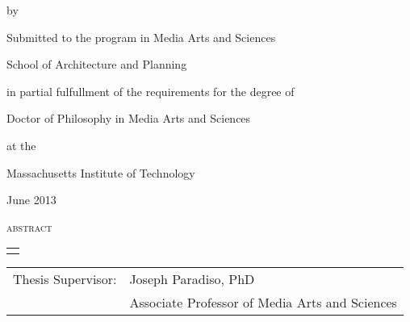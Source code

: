 \thispagestyle{empty}

\begingroup
\let\clearpage\relax
\let\cleardoublepage\relax
\let\cleardoublepage\relax

\begin{addmargin}[1cm]{-3cm}
\begin{samepage}
{\centering

    \begingroup
        \color{Maroon}
        {\Large\textsc{\myTitle}}
    \endgroup

    by

    \myName

    \vspace{4mm}

Submitted to the program in Media Arts and Sciences

School of Architecture and Planning

    \vspace{2mm}

in partial fulfullment of the requirements for the degree of

    \vspace{2mm}

Doctor of Philosophy in Media Arts and Sciences

at the

Massachusetts Institute of Technology

    \vspace{2mm}

June 2013



}

{\Large{\textsc{abstract}}}

\begin{tabular}{p{12cm}}
\hline\\
\end{tabular}


{\small

}

\vspace{4mm}
\noindent
\begin{tabular}{rl}
Thesis Supervisor:&Joseph Paradiso, PhD\\
                  &Associate Professor of Media Arts and Sciences
\end{tabular}

\end{samepage}

\end{addmargin}
\endgroup

